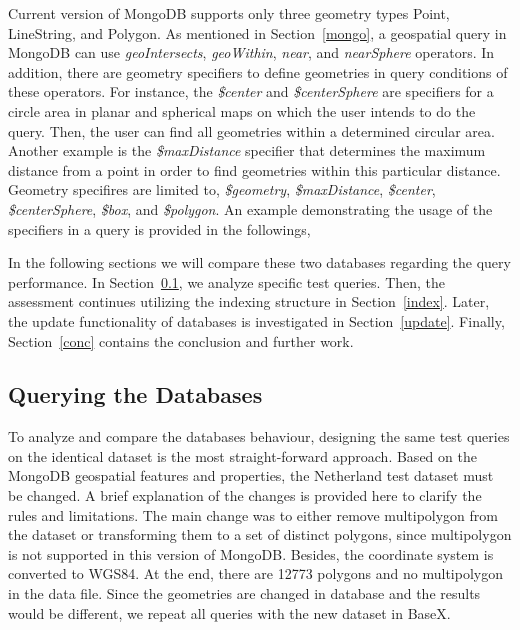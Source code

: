 \documentclass[a4paper,12pt]{article}
\begin{document}
Current version of MongoDB supports only three geometry types Point, LineString, and Polygon. As mentioned in Section~\ref{mongo}, a geospatial query in MongoDB can use \textit{geoIntersects}, \textit{geoWithin}, \textit{near}, and \textit{nearSphere} operators. In addition, there are geometry specifiers to define geometries in query conditions of these operators. For instance, the \textit{\$center} and \textit{\$centerSphere} are specifiers for a circle area in planar and spherical maps on which the user intends to do the query. Then, the user can find all geometries within a determined circular area. Another example is the \textit{\$maxDistance} specifier that determines the maximum distance from a point in order to find geometries within this particular distance. Geometry specifires are limited to, \textit{\$geometry}, \textit{\$maxDistance}, \textit{\$center}, \textit{\$centerSphere}, \textit{\$box}, and \textit{\$polygon}. An example demonstrating the usage of the specifiers in a query is provided in the followings,
\vspace{10px}
 \vspace{10px}
 
In the following sections we will compare these two databases regarding the query performance. 
In Section~\ref{s.query}, we analyze specific test queries. Then, the assessment continues
utilizing the indexing structure in Section~\ref{index}. Later, the update functionality of databases is 
investigated in Section~\ref{update}. Finally, Section~\ref{conc} contains the conclusion and further work.

\subsection{Querying the Databases}
\label{s.query}
To analyze and compare the databases behaviour, designing the same test queries on the identical dataset is the most straight-forward approach. Based on the MongoDB geospatial features and properties, the Netherland test dataset must be changed. A brief explanation of the changes is provided here to clarify the rules and limitations. The main change was to either remove multipolygon from the dataset or transforming them to a set of distinct polygons, since multipolygon is not supported in this version of MongoDB. Besides, the coordinate system is converted to WGS84. At the end, there are 12773 polygons and no multipolygon in the data file. Since the geometries are changed in database and the results would be different, we repeat all queries with the new dataset in BaseX.
\end{document}
